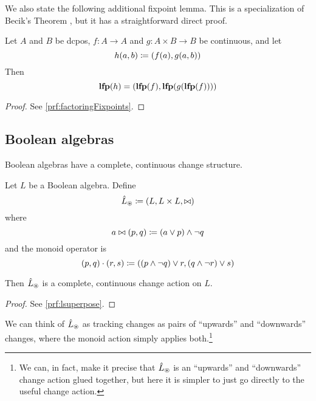 We also state the following additional fixpoint lemma. This is a specialization of
Becik's Theorem \autocite[][section 10.1]{winskel1993formal}, but it has a straightforward direct proof.

\begin{prop}[name=Factoring of fixpoints, restate=factoringFixpoints]
  \label{prop:factoringFixpoints}
  Let $A$ and $B$ be dcpos, $f : A \rightarrow A$ and $g: A \times B \rightarrow B$ be continuous, and let
  \begin{displaymath}
    h(a, b) \coloneqq (f(a), g(a, b))
  \end{displaymath}
  Then
  \begin{displaymath}
    \textbf{lfp}(h) = (\textbf{lfp}(f), \textbf{lfp}(g(\textbf{lfp}(f))))
  \end{displaymath}
\end{prop}
\ifproofs
\begin{proof}
  See \cref{prf:factoringFixpoints}.
\end{proof}
\fi

\subsection{Boolean algebras}

Boolean algebras have a complete, continuous change structure.

\begin{prop}[restate=lsuperpose]
  Let $L$ be a Boolean algebra. Define
  \begin{displaymath}
    \hat{L}_\circledast \coloneqq (L,L \times L,\bowtie)
  \end{displaymath}
  where
  \begin{displaymath}
    a \bowtie (p, q) \coloneqq (a \vee p) \wedge \neg q
  \end{displaymath}
  and the monoid operator is
  \begin{displaymath}
    (p, q) \cdot (r, s) \coloneqq ((p \wedge \neg q) \vee r, (q \wedge \neg r) \vee s)
  \end{displaymath}

  Then $\hat{L}_\circledast$ is a complete, continuous change action on $L$.
\end{prop}
\ifproofs
\begin{proof}
  See \cref{prf:lsuperpose}.
\end{proof}
\fi

We can think of $\hat{L}_\circledast$ as tracking changes as pairs of ``upwards'' and
``downwards'' changes, where the monoid action simply applies both.\footnote{We
  can, in fact, make it precise that $\hat{L}_\circledast$ is an ``upwards''
  and ``downwards'' change action glued together, but here it is simpler to
  just go directly to the useful change action.}  

